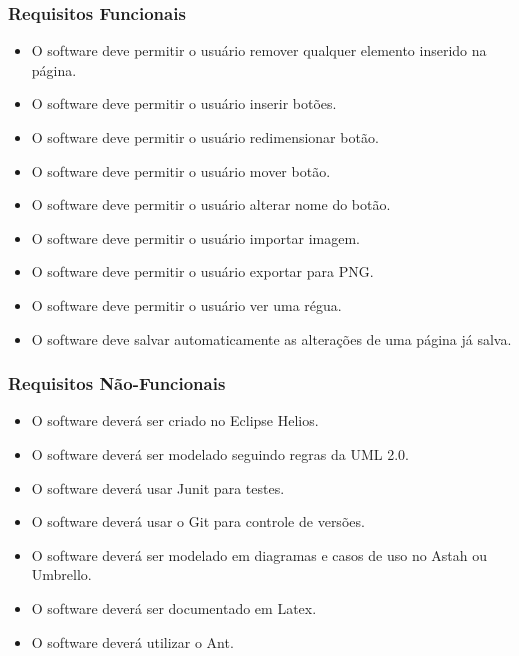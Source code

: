 \documentclass{beamer}
\begin{document}
\begin{frame}
  \frametitle{Requisitos Funcionais}
\begin{itemize}

\item  O software deve permitir o usuário  remover qualquer elemento inserido na página.
\item  O software deve permitir o usuário inserir botões.
\item  O software deve permitir o usuário redimensionar botão.
\item  O software deve permitir o usuário mover botão.
\item  O software deve permitir o usuário alterar nome do botão. 
\item  O software deve permitir o usuário importar imagem.
\item  O software deve permitir o usuário exportar para PNG.
\item   O software deve  permitir o usuário ver uma régua.
\item   O software deve salvar automaticamente as alterações de uma página já salva. 

\end{itemize}

	\end{frame}
	


\begin{frame}
  \frametitle{Requisitos Não-Funcionais}
  
\begin{itemize}


\item  O software  deverá ser criado no Eclipse Helios.
\item   O software  deverá ser modelado seguindo regras da UML 2.0.
\item   O software  deverá usar Junit para testes.
\item   O software  deverá usar o Git para controle de versões.
\item   O software  deverá ser modelado em diagramas e casos de uso no Astah ou Umbrello.
\item   O software  deverá ser documentado em Latex.
\item   O  software deverá utilizar o Ant.

\end{itemize}
  

	\end{frame}
	
\end{document}
